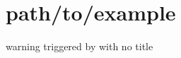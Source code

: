 \hypertarget{path_2to_2example-example}{\section{path/to/example}
}
warning triggered by with no title


\begin{DoxyCodeInclude}
\end{DoxyCodeInclude}
 